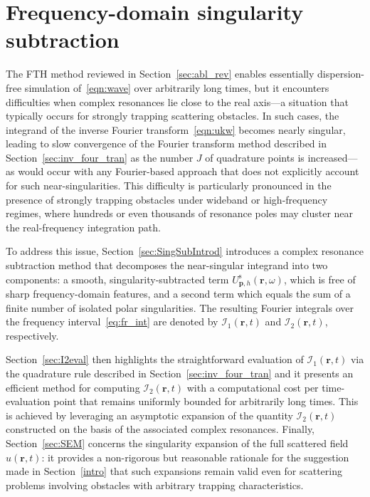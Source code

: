 \documentclass[11pt]{article}
\theoremstyle{plain}
\theoremstyle{remark}
\def \br{\mathbf{r}}
\def \bp{\mathbf{p}}
\begin{document}
\section{Frequency-domain singularity subtraction}\label{sec:RS}
The FTH method reviewed in Section~\ref{sec:abl_rev} enables
essentially dispersion-free simulation of~\eqref{eqn:wave} over
arbitrarily long times, but it encounters difficulties when complex
resonances lie close to the real axis---a situation that typically
occurs for strongly trapping scattering obstacles.  In such cases, the
integrand of the inverse Fourier transform~\eqref{eqn:ukw} becomes
nearly singular, leading to slow convergence of the Fourier transform
method described in Section~\ref{sec:inv_four_tran} as the number $J$
of quadrature points is increased---as would occur with any
Fourier-based approach that does not explicitly account for such
near-singularities. This difficulty is particularly pronounced in the
presence of strongly trapping obstacles under wideband or
high-frequency regimes, where hundreds or even thousands of resonance
poles may cluster near the real-frequency integration path.

To address this issue, Section~\ref{sec:SingSubIntrod} introduces a
complex resonance subtraction method that decomposes the near-singular
integrand into two components: a smooth, singularity-subtracted term
$U_{\bp,h}^\mathrm{s}(\br,\omega)$, which is free of sharp
frequency-domain features, and a second term which equals the sum of a
finite number of isolated polar singularities. The resulting Fourier integrals
over the frequency interval~\eqref{eq:fr_int} are denoted by
$\mathcal{I}_1(\br,t)$ and $\mathcal{I}_2(\br,t)$, respectively.

Section~\ref{sec:I2eval} then highlights the straightforward
evaluation of $\mathcal{I}_1(\br,t)$ via the quadrature rule described
in Section~\ref{sec:inv_four_tran} and it presents an efficient method
for computing $\mathcal{I}_2(\br,t)$ with a computational cost per
time-evaluation point that remains uniformly bounded for arbitrarily
long times. This is achieved by leveraging an asymptotic expansion of
the quantity $\mathcal{I}_2(\br,t)$ constructed on the basis of the
associated complex resonances.  Finally, Section~\ref{sec:SEM}
concerns the singularity expansion of the full scattered field
$u(\br,t)$: it provides a non-rigorous but reasonable rationale for the
suggestion made in Section~\ref{intro} that such expansions remain
valid even for scattering problems involving obstacles with arbitrary
trapping characteristics.
\end{document}
